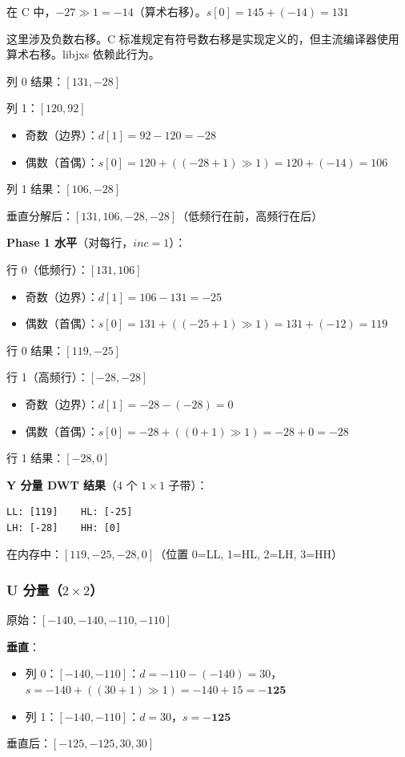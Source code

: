 在 C 中，$-27 \gg 1 = -14$（算术右移）。$s[0] = 145 + (-14) = 131$

\begin{tcolorbox}[colback=yellow!5,colframe=yellow!60!black,title=注意]
这里涉及负数右移。C 标准规定有符号数右移是实现定义的，但主流编译器使用算术右移。libjxs 依赖此行为。
\end{tcolorbox}

列 0 结果：$[131, -28]$

列 1：$[120, 92]$
\begin{itemize}
  \item 奇数（边界）：$d[1] = 92 - 120 = -28$
  \item 偶数（首偶）：$s[0] = 120 + ((-28 + 1) \gg 1) = 120 + (-14) = 106$
\end{itemize}
列 1 结果：$[106, -28]$

垂直分解后：$[131, 106, -28, -28]$（低频行在前，高频行在后）

\textbf{Phase 1 水平}（对每行，$\mathit{inc} = 1$）：

行 0（低频行）：$[131, 106]$
\begin{itemize}
  \item 奇数（边界）：$d[1] = 106 - 131 = -25$
  \item 偶数（首偶）：$s[0] = 131 + ((-25 + 1) \gg 1) = 131 + (-12) = 119$
\end{itemize}
行 0 结果：$[119, -25]$

行 1（高频行）：$[-28, -28]$
\begin{itemize}
  \item 奇数（边界）：$d[1] = -28 - (-28) = 0$
  \item 偶数（首偶）：$s[0] = -28 + ((0 + 1) \gg 1) = -28 + 0 = -28$
\end{itemize}
行 1 结果：$[-28, 0]$

\textbf{Y 分量 DWT 结果}（4 个 $1\times1$ 子带）：

\begin{lstlisting}[numbers=none]
LL: [119]    HL: [-25]
LH: [-28]    HH: [0]
\end{lstlisting}

在内存中：$[119, -25, -28, 0]$（位置 0=LL, 1=HL, 2=LH, 3=HH）

\subsubsection{U 分量（$2\times2$）}

原始：$[-140, -140, -110, -110]$

\textbf{垂直}：
\begin{itemize}
  \item 列 0：$[-140, -110]$：$d = -110-(-140) = 30$，$s = -140 + ((30+1)\gg1) = -140+15 = \mathbf{-125}$
  \item 列 1：$[-140, -110]$：$d = 30$，$s = \mathbf{-125}$
\end{itemize}
垂直后：$[-125, -125, 30, 30]$

